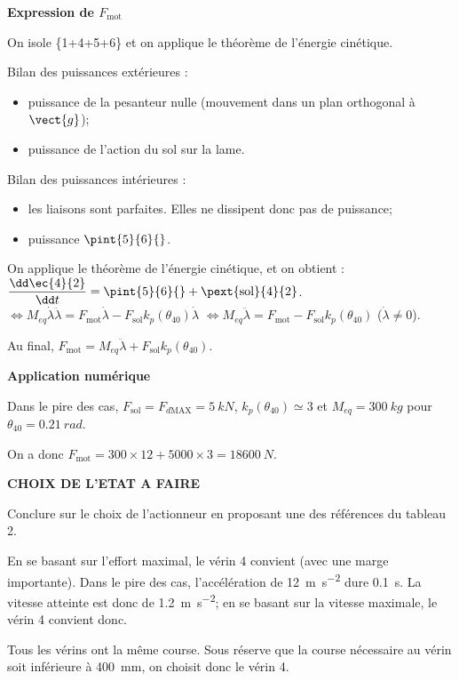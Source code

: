 \documentclass[11pt]{article}
\begin{document}
\begin{UPSTIcorrige}

\textbf{Expression de $F_{\text{mot}}$}

On isole  \{1+4+5+6\} et on applique le théorème de l'énergie cinétique. 

Bilan des puissances extérieures : 
\begin{itemize}
\item puissance de la pesanteur nulle (mouvement dans un plan orthogonal à $\vect{g}$);
\item puissance de l'action du sol sur la lame.
\end{itemize}

Bilan des puissances intérieures :
\begin{itemize}
\item les liaisons sont parfaites. Elles ne dissipent donc pas de puissance;
\item puissance $\pint{5}{6}{}$.
\end{itemize}

On applique le théorème de l'énergie cinétique, et on obtient : 
$\dfrac{\dd \ec{4}{2}}{\dd t}= \pint{5}{6}{}+\pext{\text{sol}}{4}{2}$.
$\Leftrightarrow 
M_{eq} \dot{\lambda}\ddot{\lambda}=  F_{\text{mot}}\dot{\lambda}
-F_{\text{sol}}k_p\left(\theta_{40}\right)\dot{\lambda}$
$\Leftrightarrow 
M_{eq} \ddot{\lambda}=  F_{\text{mot}}
-F_{\text{sol}}k_p\left(\theta_{40}\right)$ ($\dot{\lambda}\neq 0$).

 Au final,   $F_{\text{mot}}=M_{eq} \ddot{\lambda} + F_{\text{sol}}k_p\left(\theta_{40}\right)$.

\textbf{Application numérique}

Dans le pire des cas, $F_{\text{sol}} = F_{d \text{MAX}}=\SI{5}{kN}$, $k_p\left(\theta_{40}\right) \simeq 3$ et $M_{eq}=\SI{300}{kg}$ pour $\theta_{40}=\SI{0,21}{rad}$.

On a donc  $F_{\text{mot}}=300 \times  12 + 5000\times 3 = \SI{18 600}{N}$.

\textbf{CHOIX DE L'ETAT A FAIRE}


\end{UPSTIcorrige}





\UPSTIquestion  Conclure sur le choix de l’actionneur en proposant une des références du tableau 2.

\begin{UPSTIcorrige}
En se basant sur l'effort maximal, le vérin 4 convient (avec une marge importante).  Dans le pire des cas, l'accélération de \SI{12}{m.s^{-2}} dure \SI{0,1}{s}. La vitesse atteinte est donc de \SI{1,2}{m.s^{-2}}; en se basant sur la vitesse maximale, le vérin 4 convient donc. 

Tous les vérins ont la même course. Sous réserve que la course nécessaire au vérin soit inférieure à \SI{400}{mm}, on choisit donc le vérin 4. 
\end{UPSTIcorrige}
\end{document}
